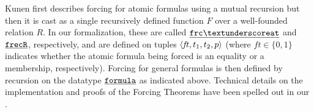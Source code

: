 Kunen first describes forcing for atomic formulas using a mutual
recursion
but then \cite[p.~257]{kunen2011set} it is cast as a single
recursively defined function $F$ over a well-founded  relation $R$.
In our formalization, these are called $\frcat$ and 
$\isatt{frecR}$, respectively, and are defined on tuples $\langle \mathit{ft},t_1,t_2,p\rangle$ (where
$\mathit{ft}\in\{0,1\}$ indicates whether the atomic formula being
forced is an equality or a membership, respectively).
Forcing for general formulas is then defined by recursion on the
datatype $\formula$ as indicated above. Technical details on the
implementation and proofs of the
Forcing Theorems have been spelled out in our
\cite{2020arXiv200109715G}.

